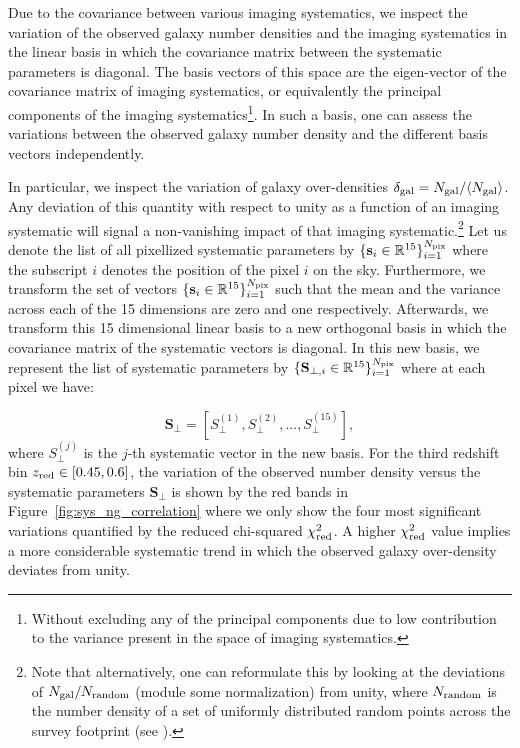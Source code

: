 \documentclass[fleqn,usenatbib,useAMS]{mnras}
\begin{document}
Due to the covariance between various imaging systematics, we inspect the variation of the observed galaxy number densities and the imaging systematics in the linear basis in which the covariance matrix between the systematic parameters is diagonal. The basis vectors of this space are the eigen-vector of the covariance matrix of imaging systematics, or equivalently the principal components of the imaging systematics\footnote{Without excluding any of the principal components due to low contribution to the variance present in the space of imaging systematics.}. In such a basis, one can assess the variations between the observed galaxy number density and the different basis vectors independently. 

In particular, we inspect the variation of galaxy over-densities $\delta_{\rm gal} = N_{\rm gal}/\langle N_{\rm gal} \rangle$. Any deviation of this quantity with respect to unity as a function of an imaging systematic will signal a non-vanishing impact of that imaging systematic.\footnote{Note that alternatively, one can reformulate this by looking at the deviations of $N_{\rm gal}/N_{\rm random}$ (module some normalization) from unity, where $N_{\rm random}$ is the number density of a set of uniformly distributed random points across the survey footprint (see \citep[e.g. ][]{bautista2018sdss, icaza2020clustering}).} 
Let us denote the list of all pixellized systematic parameters by $\{\mathbf{s}_{i} \in \mathbb{R}^{15}\}_{i=1}^{N_{\rm pix}}$ where the subscript $i$ denotes the position of the pixel $i$ on the sky. Furthermore, we transform the set of vectors 
$\{\mathbf{s}_{i} \in \mathbb{R}^{15}\}_{i=1}^{N_{\rm pix}}$ such that the mean and the variance across each of the 15 dimensions are zero and one respectively. Afterwards, we transform this 15 dimensional linear basis to a new orthogonal basis in which the covariance matrix of the systematic vectors is diagonal. In this new basis, we represent the list of systematic parameters by $\{\mathbf{S}_{\perp,i} \in \mathbb{R}^{15}\}_{i=1}^{N_{\rm pix}}$ where at each pixel we have:

\begin{equation}
    \mathbf{S}_{\perp} = [S_{\perp}^{(1)}, S_{\perp}^{(2)}, ..., S_{\perp}^{(15)}],
\end{equation}
where $S_{\perp}^{(j)}$ is the $j$-th systematic vector in the new basis. For the third redshift bin $z_{\rm red} \in [0.45, 0.6]$, the variation of the observed number density versus the systematic parameters $\mathbf{S}_{\perp}$ is shown by the red bands in Figure~\ref{fig:sys_ng_correlation} where we only show the four most significant variations quantified by the reduced chi-squared $\chi^2_{\rm red}$. A higher $\chi^{2}_{\rm red}$ value implies a more considerable systematic trend in which the observed galaxy over-density deviates from unity.  
\end{document}
